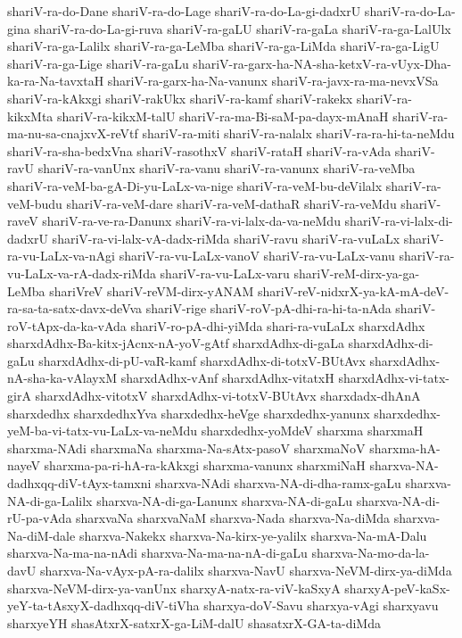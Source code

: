 {shariV-ra-do-Dane
shariV-ra-do-Lage
shariV-ra-do-La-gi-dadxrU
shariV-ra-do-La-gina
shariV-ra-do-La-gi-ruva
shariV-ra-gaLU
shariV-ra-gaLa
shariV-ra-ga-LalUlx
shariV-ra-ga-Lalilx
shariV-ra-ga-LeMba
shariV-ra-ga-LiMda
shariV-ra-ga-LigU
shariV-ra-ga-Lige
shariV-ra-gaLu
shariV-ra-garx-ha-NA-sha-ketxV-ra-vUyx-Dha-ka-ra-Na-tavxtaH
shariV-ra-garx-ha-Na-vanunx
shariV-ra-javx-ra-ma-nevxVSa
shariV-ra-kAkxgi
shariV-rakUkx
shariV-ra-kamf
shariV-rakekx
shariV-ra-kikxMta
shariV-ra-kikxM-talU
shariV-ra-ma-Bi-saM-pa-dayx-mAnaH
shariV-ra-ma-nu-sa-cnajxvX-reVtf
shariV-ra-miti
shariV-ra-nalalx
shariV-ra-ra-hi-ta-neMdu
shariV-ra-sha-bedxVna
shariV-rasothxV
shariV-rataH
shariV-ra-vAda
shariV-ravU
shariV-ra-vanUnx
shariV-ra-vanu
shariV-ra-vanunx
shariV-ra-veMba
shariV-ra-veM-ba-gA-Di-yu-LaLx-va-nige
shariV-ra-veM-bu-deVilalx
shariV-ra-veM-budu
shariV-ra-veM-dare
shariV-ra-veM-dathaR
shariV-ra-veMdu
shariV-raveV
shariV-ra-ve-ra-Danunx
shariV-ra-vi-lalx-da-va-neMdu
shariV-ra-vi-lalx-di-dadxrU
shariV-ra-vi-lalx-vA-dadx-riMda
shariV-ravu
shariV-ra-vuLaLx
shariV-ra-vu-LaLx-va-nAgi
shariV-ra-vu-LaLx-vanoV
shariV-ra-vu-LaLx-vanu
shariV-ra-vu-LaLx-va-rA-dadx-riMda
shariV-ra-vu-LaLx-varu
shariV-reM-dirx-ya-ga-LeMba
shariVreV
shariV-reVM-dirx-yANAM
shariV-reV-nidxrX-ya-kA-mA-deV-ra-sa-ta-satx-davx-deVva
shariV-rige
shariV-roV-pA-dhi-ra-hi-ta-nAda
shariV-roV-tApx-da-ka-vAda
shariV-ro-pA-dhi-yiMda
shari-ra-vuLaLx
sharxdAdhx
sharxdAdhx-Ba-kitx-jAcnx-nA-yoV-gAtf
sharxdAdhx-di-gaLa
sharxdAdhx-di-gaLu
sharxdAdhx-di-pU-vaR-kamf
sharxdAdhx-di-totxV-BUtAvx
sharxdAdhx-nA-sha-ka-vAlayxM
sharxdAdhx-vAnf
sharxdAdhx-vitatxH
sharxdAdhx-vi-tatx-girA
sharxdAdhx-vitotxV
sharxdAdhx-vi-totxV-BUtAvx
sharxdadx-dhAnA
sharxdedhx
sharxdedhxYva
sharxdedhx-heVge
sharxdedhx-yanunx
sharxdedhx-yeM-ba-vi-tatx-vu-LaLx-va-neMdu
sharxdedhx-yoMdeV
sharxma
sharxmaH
sharxma-NAdi
sharxmaNa
sharxma-Na-sAtx-pasoV
sharxmaNoV
sharxma-hA-nayeV
sharxma-pa-ri-hA-ra-kAkxgi
sharxma-vanunx
sharxmiNaH
sharxva-NA-dadhxqq-diV-tAyx-tamxni
sharxva-NAdi
sharxva-NA-di-dha-ramx-gaLu
sharxva-NA-di-ga-Lalilx
sharxva-NA-di-ga-Lanunx
sharxva-NA-di-gaLu
sharxva-NA-di-rU-pa-vAda
sharxvaNa
sharxvaNaM
sharxva-Nada
sharxva-Na-diMda
sharxva-Na-diM-dale
sharxva-Nakekx
sharxva-Na-kirx-ye-yalilx
sharxva-Na-mA-Dalu
sharxva-Na-ma-na-nAdi
sharxva-Na-ma-na-nA-di-gaLu
sharxva-Na-mo-da-la-davU
sharxva-Na-vAyx-pA-ra-dalilx
sharxva-NavU
sharxva-NeVM-dirx-ya-diMda
sharxva-NeVM-dirx-ya-vanUnx
sharxyA-natx-ra-viV-kaSxyA
sharxyA-peV-kaSx-yeY-ta-tAsxyX-dadhxqq-diV-tiVha
sharxya-doV-Savu
sharxya-vAgi
sharxyavu
sharxyeYH
shasAtxrX-satxrX-ga-LiM-dalU
shasatxrX-GA-ta-diMda
}
